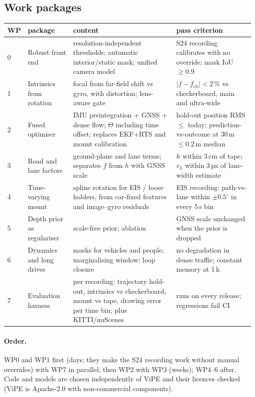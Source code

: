 \documentclass[10pt,a4paper]{article}
\begin{document}
\subsection{Work packages}
\begin{table}[H]
\centering\small
\begin{tabularx}{\textwidth}{@{}p{0.5cm}p{3cm}LL@{}}
\toprule
WP & package & content & pass criterion \\
 & Robust front end & resolution-independent thresholds; automatic interior/static mask; unified camera model & S24 recording calibrates with no override; mask IoU $\ge0.9$ \\
1 & Intrinsics from rotation & focal from far-field shift vs gyro, with distortion; lens-aware gate & $|f-f_\text{cb}| < 2\,\%$ vs checkerboard, main and ultra-wide \\
2 & Fused optimiser & IMU preintegration + GNSS + dense flow; $\Theta$ including time offset; replaces EKF+RTS and mount calibration & hold-out position RMS $\le$ today; prediction-vs-outcome at 30\,m $\le0.2$\,m median \\
3 & Road and lane factors & ground-plane and lane terms; separates $f$ from $h$ with GNSS scale & $h$ within 3\,cm of tape; $v_h$ within 3\,px of lane-width estimate \\
4 & Time-varying mount & spline rotation for EIS / loose holders, from car-fixed features and image--gyro residuals & EIS recording: path-vs-lane within $\pm0.5^\circ$ in every 5\,s bin \\
5 & Depth prior as regulariser & scale-free prior; ablation & GNSS scale unchanged when the prior is dropped \\
6 & Dynamics and long drives & masks for vehicles and people; marginalising window; loop closure & no degradation in dense traffic; constant memory at 1\,h \\
7 & Evaluation harness & per recording: trajectory hold-out, intrinsics vs checkerboard, mount vs tape, drawing error per time bin; plus KITTI/nuScenes & runs on every release; regressions fail CI \\
\bottomrule
\end{tabularx}
\end{table}

\paragraph{Order.} WP0 and WP1 first (days; they make the S24 recording work without manual overrides) with
WP7 in parallel; then WP2 with WP3 (weeks); WP4--6 after. Code and models are chosen independently of ViPE
and their licences checked (ViPE is Apache-2.0 with non-commercial components).
\end{document}
